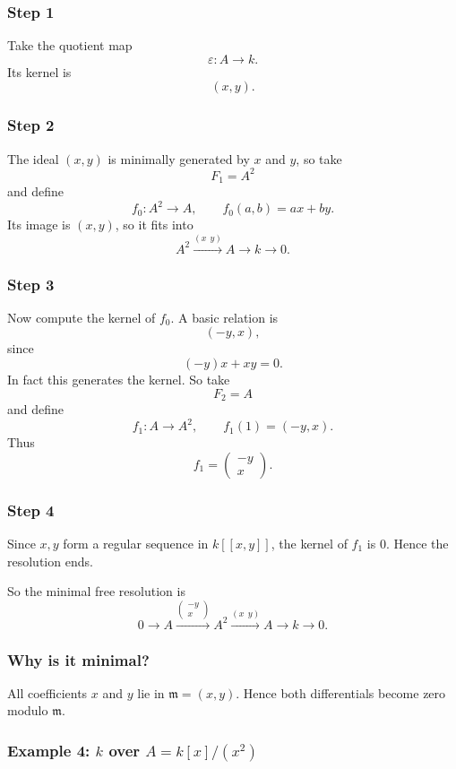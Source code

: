 \documentclass[12pt,a4paper]{article}
\theoremstyle{notespace}
\newcommand{\m}{\mathfrak m}
\begin{document}
\subsubsection*{Step 1}
Take the quotient map
\[
\varepsilon:A\to k.
\]
Its kernel is
\[
(x,y).
\]

\subsubsection*{Step 2}
The ideal \((x,y)\) is minimally generated by \(x\) and \(y\), so take
\[
F_1=A^2
\]
and define
\[
f_0:A^2\to A,\qquad f_0(a,b)=ax+by.
\]
Its image is \((x,y)\), so it fits into
\[
A^2\xrightarrow{(x\ \ y)}A\to k\to 0.
\]

\subsubsection*{Step 3}
Now compute the kernel of \(f_0\). A basic relation is
\[
(-y,x),
\]
since
\[
(-y)x + xy = 0.
\]
In fact this generates the kernel. So take
\[
F_2=A
\]
and define
\[
f_1:A\to A^2,\qquad f_1(1)=(-y,x).
\]
Thus
\[
f_1=\begin{pmatrix}-y\\x\end{pmatrix}.
\]

\subsubsection*{Step 4}
Since \(x,y\) form a regular sequence in \(k[[x,y]]\), the kernel of \(f_1\) is \(0\). Hence the resolution ends.

So the minimal free resolution is
\[
0\longrightarrow A \xrightarrow{\begin{pmatrix}-y\\x\end{pmatrix}} A^2 \xrightarrow{(x\ \ y)} A \longrightarrow k \longrightarrow 0.
\]

\subsubsection*{Why is it minimal?}
All coefficients \(x\) and \(y\) lie in \(\m=(x,y)\). Hence both differentials become zero modulo \(\m\).

\subsubsection{Example 4: \(k\) over \(A=k[x]/(x^2)\)}
\end{document}
